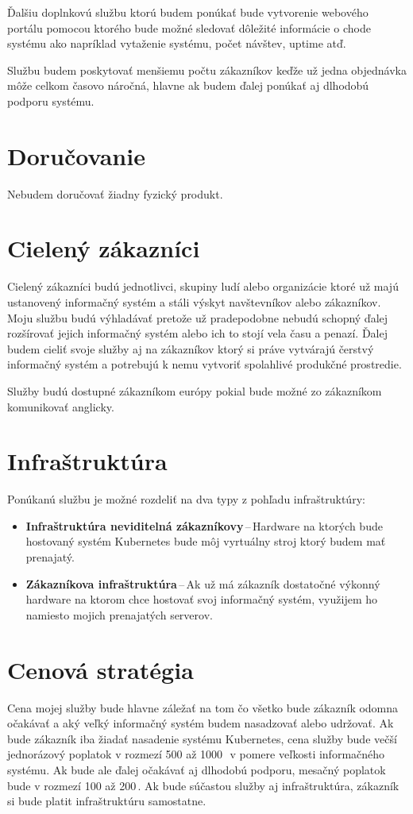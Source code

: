 Ďalšiu doplnkovú službu ktorú budem ponúkať bude vytvorenie webového portálu pomocou ktorého bude možné sledovať dôležité informácie o chode systému ako napríklad vytaženie systému, počet návštev, uptime atď.

Službu budem poskytovať menšiemu počtu zákazníkov keďže už jedna objednávka môže celkom časovo náročná, hlavne ak budem ďalej ponúkať aj dlhodobú podporu systému.


\section{Doručovanie}

Nebudem doručovať žiadny fyzický produkt.

\section{Cielený zákazníci}

Cielený zákazníci budú jednotlivci, skupiny ludí alebo organizácie ktoré už majú ustanovený informačný systém a stáli výskyt navštevníkov alebo zákazníkov. Moju službu budú výhladávať pretože už pradepodobne nebudú schopný ďalej rozšírovať jejich informačný systém alebo ich to stojí vela času a penazí. Ďalej budem cieliť svoje služby aj na zákazníkov ktorý si práve vytvárajú čerstvý informačný systém a potrebujú k nemu vytvoriť spolahlivé produkčné prostredie.

Služby budú dostupné zákazníkom európy pokial bude možné zo zákazníkom komunikovať anglicky.

\section{Infraštruktúra}

Ponúkanú službu je možné rozdeliť na dva typy z pohľadu infraštruktúry:
\begin{itemize}
  \item \textbf{Infraštruktúra neviditelná zákazníkovy}\,--\,Hardware na ktorých bude hostovaný systém Kubernetes bude môj vyrtuálny stroj ktorý budem mať prenajatý.
  \item \textbf{Zákazníkova infraštruktúra}\,--\,Ak už má zákazník dostatočné výkonný hardware na ktorom chce hostovať svoj informačný systém, využijem ho namiesto mojich prenajatých serverov.
\end{itemize}

\section{Cenová stratégia}
Cena mojej služby bude hlavne záležať na tom čo všetko bude zákazník odomna očakávať a aký veľký informačný systém budem nasadzovať alebo udržovať. Ak bude zákazník iba žiadať nasadenie systému Kubernetes, cena služby bude večší jednorázový poplatok v rozmezí 500 až 1000\,\texteuro\ v pomere veľkosti informačného systému. Ak bude ale ďalej očakávať aj dlhodobú podporu, mesačný poplatok bude v rozmezí 100 až 200\,\texteuro. Ak bude súčastou služby aj infraštruktúra, zákazník si bude platit infraštruktúru samostatne.

